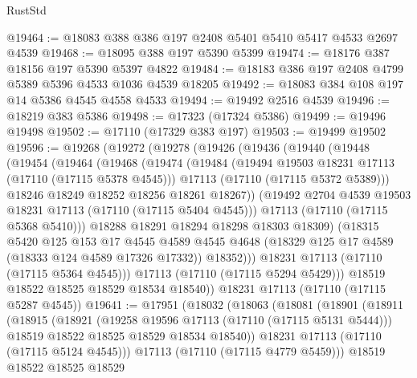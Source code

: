 \begin{lexlean}{RustStd}
\begin{coremodule}
@19464 := @18083 @388 @386 @197 @2408 @5401 @5410 @5417 @4533 @2697 @4539
@19468 := @18095 @388 @197 @5390 @5399
@19474 := @18176 @387 @18156 @197 @5390 @5397 @4822
@19484 := @18183 @386 @197 @2408 @4799 @5389 @5396 @4533 @1036 @4539 @18205
@19492 := @18083 @384 @108 @197 @14 @5386 @4545 @4558 @4533
@19494 := @19492 @2516 @4539
@19496 := @18219 @383 @5386
@19498 := @17323 (@17324 @5386)
@19499 := @19496 @19498
@19502 := @17110 (@17329 @383 @197)
@19503 := @19499 @19502
@19596 := @19268
    (@19272
      (@19278
        (@19426
          (@19436
            (@19440
              (@19448
                (@19454
                  (@19464
                    (@19468
                      (@19474
                        (@19484
                          (@19494 @19503 @18231 @17113 (@17110 (@17115 @5378 @4545)))
                          @17113
                          (@17110 (@17115 @5372 @5389)))
                        @18246
                        @18249
                        @18252
                        @18256
                        @18261
                        @18267))
                    (@19492 @2704 @4539 @19503 @18231 @17113 (@17110 (@17115 @5404 @4545)))
                    @17113
                    (@17110 (@17115 @5368 @5410)))
                  @18288
                  @18291
                  @18294
                  @18298
                  @18303
                  @18309)
                (@18315
                  @5420
                  @125
                  @153
                  @17
                  @4545
                  @4589
                  @4545
                  @4648
                  (@18329 @125 @17 @4589 (@18333 @124 @4589 @17326 @17332))
                  @18352)))
            @18231
            @17113
            (@17110 (@17115 @5364 @4545)))
          @17113
          (@17110 (@17115 @5294 @5429)))
        @18519
        @18522
        @18525
        @18529
        @18534
        @18540))
    @18231
    @17113
    (@17110 (@17115 @5287 @4545))
@19641 := @17951
    (@18032
      (@18063
        (@18081
          (@18901
            (@18911
              (@18915
                (@18921
                  (@19258 @19596 @17113 (@17110 (@17115 @5131 @5444)))
                  @18519
                  @18522
                  @18525
                  @18529
                  @18534
                  @18540))
              @18231
              @17113
              (@17110 (@17115 @5124 @4545)))
            @17113
            (@17110 (@17115 @4779 @5459)))
          @18519
          @18522
          @18525
          @18529

\end{coremodule}
\end{lexlean}
